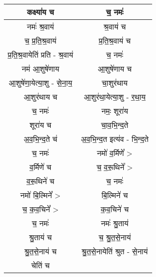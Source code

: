 {\begin{longtable}{|c|c|}
\hline
कक्ष्या॑य च                    & च॒ नमः॑\\
\hline
नमः॑ श्र॒वाय॑                   & श्र॒वाय॑ च\\
\hline
च॒ प्र॒ति॒श्र॒वाय॑                 & प्र॒ति॒श्र॒वाय॑ च\\
\hline
प्र॒ति॒श्र॒वायेति॑ प्रति - श्र॒वाय॑    & च॒ नमः॑\\
\hline
नम॑ आ॒शुषे॑णाय                   & आ॒शुषे॑णाय च\\
\hline
आ॒शुषे॑णा॒येत्या॒शु - से॒ना॒य॒           & चा॒शुर॑थाय\\
\hline
आ॒शुर॑थाय च                    & आ॒शुर॑था॒येत्या॒शु - र॒था॒य॒\\
\hline
च॒ नमः॑                       & नमः॒ शूरा॑य\\
\hline
शूरा॑य च                      & चा॒व॒भि॒न्द॒ते\\
\hline
अ॒व॒भि॒न्द॒ते च॑                   & अ॒व॒भि॒न्द॒त इत्य॑व - भि॒न्द॒ते\\
\hline
च॒ नमः॑                       & नमो॑ व॒र्मिणे᳚ >\\
\hline
व॒र्मिणे॑ च                     & च॒ व॒रू॒थिने᳚ >\\
\hline
व॒रू॒थिने॑ च                     & च॒ नमः॑\\
\hline
नमो॑ बि॒ल्मिने᳚ >                & बि॒ल्मिने॑ च\\
\hline
च॒ क॒व॒चिने᳚ >                   & क॒व॒चिने॑ च\\
\hline
च॒ नमः॑                       & नमः॑ श्रु॒ताय॑\\
\hline
श्रु॒ताय॑ च                     & च॒ श्रु॒त॒से॒नाय॑\\
\hline
श्रु॒त॒से॒नाय॑ च                   & श्रु॒त॒से॒नायेति॑ श्रुत - से॒नाय॑\\
\hline
चेति॑ च                       & \\
\hline
\end{longtable}
}
